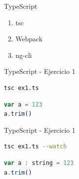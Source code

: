 \documentclass[aspectratio=169]{beamer}
\begin{document}
\begin{frame}[fragile]{TypeScript}


\begin{enumerate}
	\item tsc
	\item Webpack
	\item ng-cli
\end{enumerate}
\end{frame}

\begin{frame}[fragile]{TypeScript - Ejercicio 1}

\begin{lstlisting}[language=bash]
tsc ex1.ts
\end{lstlisting}

\begin{lstlisting}[language=JavaScript]
var a = 123
a.trim()
\end{lstlisting}

\end{frame}

\begin{frame}[fragile]{TypeScript - Ejercicio 1}

\begin{lstlisting}[language=bash]
tsc ex1.ts --watch
\end{lstlisting}

\begin{lstlisting}[language=JavaScript]
var a : string = 123
a.trim()
\end{lstlisting}

\end{frame}
\end{document}
